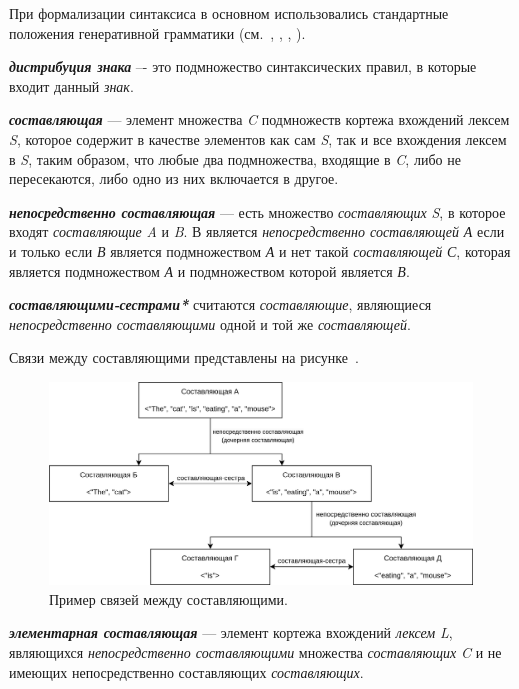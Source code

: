 При формализации синтаксиса в основном использовались стандартные положения генеративной грамматики (см.~, , , ).

\textbf{\textit{дистрибуция знака}} –- это подмножество синтаксических правил, в которые входит данный \textit{знак}.

\textbf{\textit{составляющая}} --- элемент множества \textit{C} подмножеств кортежа вхождений лексем \textit{S}, которое содержит в качестве элементов как сам \textit{S}, так и все вхождения лексем в \textit{S}, таким образом, что любые два подмножества, входящие в \textit{C}, либо не пересекаются, либо одно из них включается в другое.

\textbf{\textit{непосредственно составляющая}} ---  есть множество \textit{составляющих} \textit{S}, в которое входят \textit{составляющие} \textit{A} и \textit{B}. В является \textit{непосредственно составляющей} \textit{А} если и только если \textit{В} является подмножеством \textit{А} и нет такой \textit{составляющей} \textit{С}, которая является подмножеством \textit{А} и подмножеством которой является \textit{В}.

\textbf{\textit{составляющими-сестрами*}} считаются \textit{составляющие}, являющиеся \textit{непосредственно составляющими} одной и той же \textit{составляющей}.

Связи между составляющими представлены на рисунке~\textit{}.

\begin{figure}[h]
    \centering
    \includegraphics[scale=0.15]{images/part2/chapter_lang/syntactic_example}
    \caption{Пример связей между составляющими.}
    \label{fig:syntactic_example}
\end{figure}

\textbf{\textit{элементарная составляющая}} --- элемент кортежа вхождений \textit{лексем} \textit{L}, являющихся \textit{непосредственно составляющими} множества \textit{составляющих} \textit{C} и не имеющих непосредственно составляющих \textit{составляющих}.

